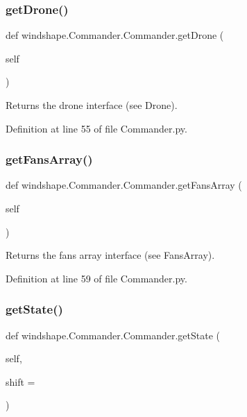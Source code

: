 \subsubsection{\texorpdfstring{get\+Drone()}{getDrone()}}
{\footnotesize\ttfamily def windshape.\+Commander.\+Commander.\+get\+Drone (\begin{DoxyParamCaption}\item[{}]{self }\end{DoxyParamCaption})}

\begin{DoxyVerb}Returns the drone interface (see Drone).\end{DoxyVerb}
 

Definition at line 55 of file Commander.\+py.

\mbox{\label{classwindshape_1_1_commander_1_1_commander_a706de451ebba6d6c28dbb6db81ae1763}} 
\subsubsection{\texorpdfstring{get\+Fans\+Array()}{getFansArray()}}
{\footnotesize\ttfamily def windshape.\+Commander.\+Commander.\+get\+Fans\+Array (\begin{DoxyParamCaption}\item[{}]{self }\end{DoxyParamCaption})}

\begin{DoxyVerb}Returns the fans array interface (see FansArray).\end{DoxyVerb}
 

Definition at line 59 of file Commander.\+py.

\mbox{\label{classwindshape_1_1_commander_1_1_commander_acb51776e8a0d70e32f93988565b78c40}} 
\subsubsection{\texorpdfstring{get\+State()}{getState()}}
{\footnotesize\ttfamily def windshape.\+Commander.\+Commander.\+get\+State (\begin{DoxyParamCaption}\item[{}]{self,  }\item[{}]{shift = {} }\end{DoxyParamCaption})}

